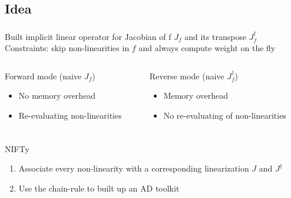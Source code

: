 \documentclass[aspectratio=169,xcolor=dvipsnames]{beamer}
\begin{document}
\subsection{Idea}
\begin{frame}
	\frametitle{\insertsection}
	\framesubtitle{\insertsubsection}

	Built implicit linear operator for Jacobian of f $J_f$ and its transpose $J_f^\dagger$
	\vspace{1em}
	\\ Constraints: skip non-linearities in $f$ and always compute weight on the fly

	\vspace{3em}
	\begin{columns}[T]
		\begin{column}{0.48\textwidth}
			\centering Forward mode (naive $J_f$)
			\begin{itemize}
				\item No memory overhead
				\item Re-evaluating non-linearities
			\end{itemize}
		\end{column}
		\begin{column}{0.48\textwidth}
			\centering Reverse mode (naive $J_f^\dagger$)
			\begin{itemize}
				\item Memory overhead
				\item No re-evaluating of non-linearities
			\end{itemize}
		\end{column}
	\end{columns}

\end{frame}

\begin{frame}
	\frametitle{\insertsection}
	\framesubtitle{\insertsubsection}

	NIFTy
	\begin{enumerate}
		\item Associate every non-linearity with a corresponding linearization $J$ and $J^\dagger$
		\item Use the chain-rule to built up an AD toolkit
	\end{enumerate}

\end{frame}
\end{document}
